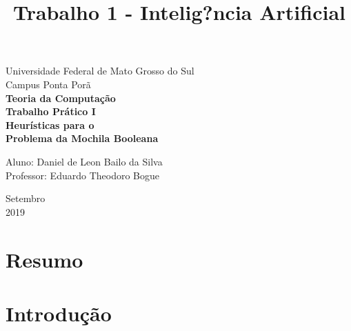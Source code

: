 \documentclass[a4paper, 12pt]{article}
\title{Trabalho 1 - Intelig?ncia Artificial}
\begin{document}
\begin{titlepage}
    \begin{center}
		\LARGE{Universidade Federal de Mato Grosso do Sul}\\
		\vspace{5pt}
        \large{Campus Ponta Porã}\\ 
        \large{{\textbf{Teoria da Computação}}}\\ 
        \vspace{15pt}
        \vspace{95pt}
        \textbf{\large{Trabalho Prático I}}\\
        \vspace{15pt}
        \textbf{\LARGE{Heurísticas para o \\Problema da Mochila Booleana}}\\
        \vspace{5cm}
    \end{center}
    
    \begin{flushleft}
        \begin{tabbing}
            Aluno: Daniel de Leon Bailo da Silva\\            
            Professor: Eduardo Theodoro Bogue\\
    \end{tabbing}
 \end{flushleft}
    \vspace{1cm}
    
    \begin{center}
        \vspace{\fill}
            Setembro\\
         2019
            \end{center}
\end{titlepage}

\clearpage
\tableofcontents
\thispagestyle{empty}
\clearpage


\section*{Resumo}

\section{Introdução}
\end{document}
